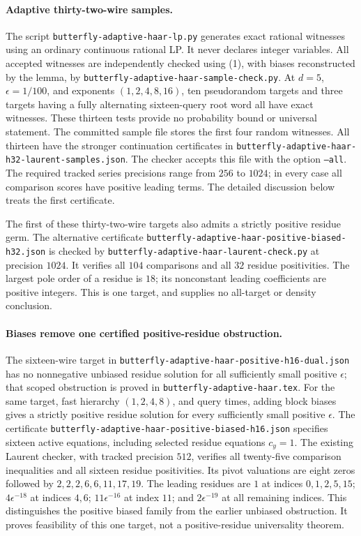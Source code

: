 \documentclass[11pt]{article}
\begin{document}
\paragraph{Adaptive thirty-two-wire samples.}
The script \texttt{butterfly-adaptive-haar-lp.py} generates exact rational
witnesses using an ordinary continuous rational LP. It never declares
integer variables. All accepted witnesses are independently checked
using (1), with biases reconstructed by the lemma, by
\texttt{butterfly-adaptive-haar-sample-check.py}.
At $d=5$, $\epsilon=1/100$, and exponents $(1,2,4,8,16)$, ten
pseudorandom targets and three targets having a fully alternating
sixteen-query root word all have exact witnesses. These thirteen tests
provide no probability bound or universal statement. The committed sample file stores the first four random witnesses.
All thirteen have the stronger continuation certificates in
\texttt{butterfly-adaptive-haar-h32-laurent-samples.json}. The checker
accepts this file with the option \texttt{--all}. The required tracked
series precisions range from $256$ to $1024$; in every case all comparison
scores have positive leading terms. The detailed discussion below treats
the first certificate.

The first of these thirty-two-wire targets also admits a strictly
positive residue germ. The alternative certificate
\texttt{butterfly-adaptive-haar-positive-biased-h32.json} is checked by
\texttt{butterfly-adaptive-haar-laurent-check.py} at precision $1024$.
It verifies all $104$ comparisons and all $32$ residue positivities.
The largest pole order of a residue is $18$; its nonconstant leading
coefficients are positive integers. This is one target, and supplies
no all-target or density conclusion.

\paragraph{Biases remove one certified positive-residue obstruction.}
The sixteen-wire target in
\texttt{butterfly-adaptive-haar-positive-h16-dual.json} has no nonnegative
unbiased residue solution for all sufficiently small positive $\epsilon$;
that scoped obstruction is proved in \texttt{butterfly-adaptive-haar.tex}.
For the same target, fast hierarchy $(1,2,4,8)$, and query times, adding
block biases gives a strictly positive residue solution for every
sufficiently small positive $\epsilon$. The certificate
\texttt{butterfly-adaptive-haar-positive-biased-h16.json} specifies sixteen
active equations, including selected residue equations $c_y=1$.
The existing Laurent checker, with tracked precision $512$, verifies
all twenty-five comparison inequalities and all sixteen residue
positivities. Its pivot valuations are eight zeros followed by
$2,2,2,6,6,11,17,19$. The leading residues are $1$ at indices
$0,1,2,5,15$; $4\epsilon^{-18}$ at indices $4,6$;
$11\epsilon^{-16}$ at index $11$; and
$2\epsilon^{-19}$ at all remaining indices.
This distinguishes the positive biased family from the earlier
unbiased obstruction. It proves feasibility of this one target,
not a positive-residue universality theorem.
\end{document}
